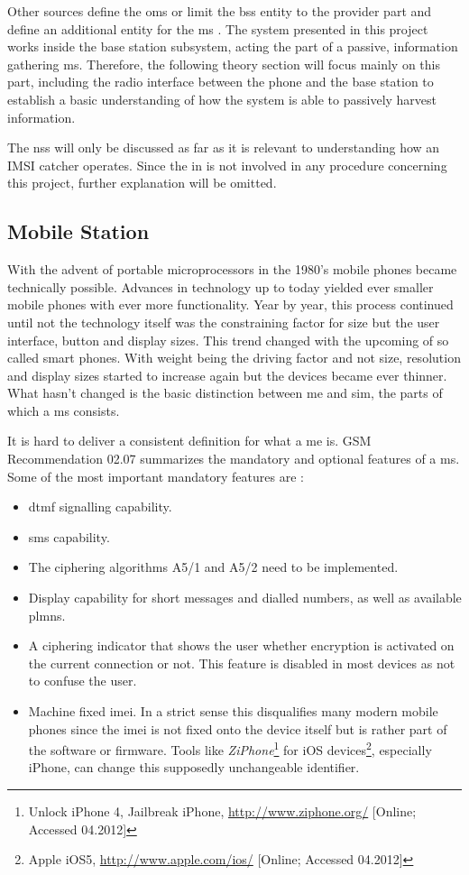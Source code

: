 Other sources define the \gls{oms} \cite{GSM2009} or limit the \gls{bss} entity to the provider part and define an additional entity for the \gls{ms} \cite{overview1994, overview1996}.
The system presented in this project works inside the base station subsystem, acting the part of a passive, information gathering \gls{ms}.
Therefore, the following theory section will focus mainly on this part, including the radio interface between the phone and the base station to establish a basic understanding of how the system is able to passively harvest information.

The \gls{nss} will only be discussed as far as it is relevant to understanding how an IMSI catcher operates.
Since the \gls{in} is not involved in any procedure concerning this project, further explanation will be omitted.

\subsection{Mobile Station}
\label{sec:ms}
With the advent of portable microprocessors in the 1980's mobile phones became technically possible.
Advances in technology up to today yielded ever smaller mobile phones with ever more functionality.
Year by year, this process continued until not the technology itself was the constraining factor for size but the user interface, \eg button and display sizes.
This trend changed with the upcoming of so called smart phones. 
With weight being the driving factor and not size, resolution and display sizes started to increase again but the devices became ever thinner.
What hasn't changed is the basic distinction between \gls{me} and \gls{sim}, the parts of which a \gls{ms} consists.

It is hard to deliver a consistent definition for what a \gls{me} is.
GSM Recommendation 02.07 \cite{GSM0207} summarizes the mandatory and optional features of a \gls{ms}.
Some of the most important mandatory features are \cite{protocols1999}:
\begin{itemize}
	\item \gls{dtmf} signalling capability.
	\item \gls{sms} capability.
	\item The ciphering algorithms A5/1 and A5/2 need to be implemented.
	\item Display capability for short messages and dialled numbers, as well as available \glspl{plmn}.
	\item A ciphering indicator that shows the user whether encryption is activated on the current connection or not.
	This feature is disabled in most devices as not to confuse the user.
	\item Machine fixed \gls{imei}.
	In a strict sense this disqualifies many modern mobile phones since the \gls{imei} is not fixed onto the device itself but is rather part of the software or firmware.
	Tools like \emph{ZiPhone}\footnote{Unlock iPhone 4, Jailbreak iPhone, \url{http://www.ziphone.org/} [Online; Accessed 04.2012]} for iOS devices\footnote{Apple iOS5, \url{http://www.apple.com/ios/} [Online; Accessed 04.2012]}, especially iPhone, can change this supposedly unchangeable identifier.
\end{itemize}

